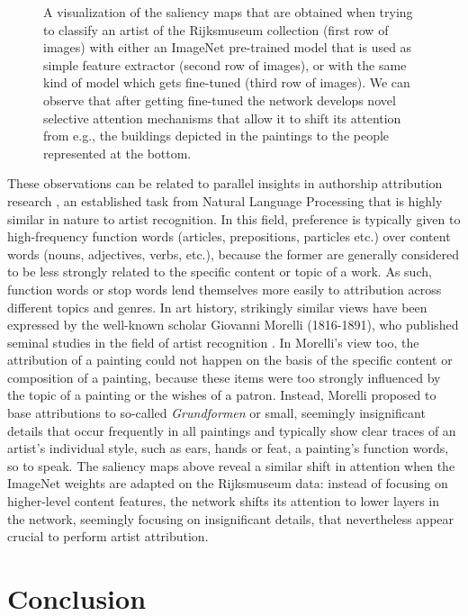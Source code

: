 \begin{figure}[!htb]
\endminipage
\fi

\caption{A visualization of the saliency maps that are obtained when trying to classify an artist of the Rijksmuseum collection (first row of images) with either an ImageNet pre-trained model that is used as simple feature extractor (second row of images), or with the same kind of model which gets fine-tuned (third row of images). We can observe that after getting fine-tuned the network develops novel selective attention mechanisms that allow it to shift its attention from e.g., the buildings depicted in the paintings to the people represented at the bottom.}
\label{fig:saliency_maps}
\end{figure}


These observations can be related to parallel insights in authorship attribution research \cite{stamatatos:2009}, an established task from Natural Language Processing that is highly similar in nature to artist recognition. In this field, preference is typically given to high-frequency function words (articles, prepositions, particles etc.) over content words (nouns, adjectives, verbs, etc.), because the former are generally considered to be less strongly related to the specific content or topic of a work. As such, function words or stop words lend themselves more easily to attribution across different topics and genres. In art history, strikingly similar views have been expressed by the well-known scholar Giovanni Morelli (1816-1891), who published seminal studies in the field of artist recognition \cite{wollheim:1972}. In Morelli's view too, the attribution of a painting could not happen on the basis of the specific content or composition of a painting, because these items were too strongly influenced by the topic of a painting or the wishes of a patron. Instead, Morelli proposed to base attributions to so-called \emph{Grundformen} or small, seemingly insignificant details that occur frequently in all paintings and typically show clear traces of an artist's individual style, such as ears, hands or feat, a painting's function words, so to speak. The saliency maps above reveal a similar shift in attention when the ImageNet weights are adapted on the Rijksmuseum data: instead of focusing on higher-level content features, the network shifts its attention to lower layers in the network, seemingly focusing on insignificant details, that nevertheless appear crucial to perform artist attribution.


\section{Conclusion} 
\label{sec:ch_4_conclusion}
 
